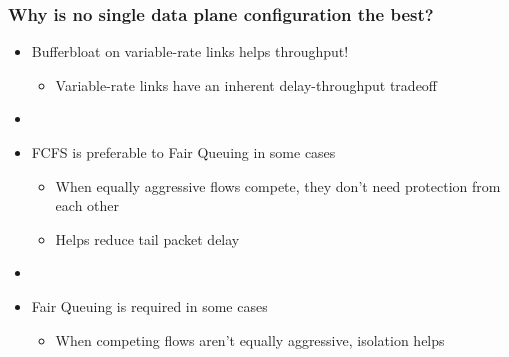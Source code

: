 \begin{Large}
\begin{frame}[plain]
\end{frame}

\begin{frame}[plain]
\frametitle{Why is no single data plane configuration the best?}
\begin{itemize}
\item Bufferbloat on variable-rate links helps throughput!
      \begin{itemize}
      \item Variable-rate links have an inherent delay-throughput tradeoff
      \end{itemize} 

\item[] 

\item FCFS is preferable to Fair Queuing in some cases
      \begin{itemize}
      \item When equally aggressive flows compete, they don't need
        protection from each other
        \item Helps reduce tail packet delay
      \end{itemize}

\item[]

\item Fair Queuing is required in some cases
      \begin{itemize}      
      \item When competing flows aren't equally aggressive,
        isolation helps
      \end{itemize}
\end{itemize}
\end{frame}


\end{Large}
